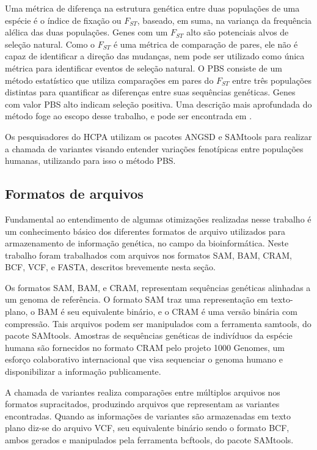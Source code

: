 \documentclass[cic,tc]{iiufrgs}
\begin{document}
Uma métrica de diferença na estrutura genética entre duas populações de uma
espécie é o índice de fixação ou $F_{ST}$, baseado, em suma, na variança da
frequência alélica das duas populações. Genes com um $F_{ST}$ alto são
potenciais alvos de seleção natural.\cite{yi2010sequencing} Como o $F_{ST}$ é
uma métrica de comparação de pares, ele não é capaz de identificar a direção
das mudanças, nem pode ser utilizado como única métrica para identificar
eventos de seleção natural. O PBS consiste de um método estatístico que
utiliza comparações em pares do $F_{ST}$ entre três populações distintas para
quantificar as diferenças entre suas sequências genéticas. Genes com valor
PBS alto indicam seleção positiva.\cite{jiang2019population} Uma descrição
mais aprofundada do método foge ao escopo desse trabalho, e pode ser
encontrada em \cite{yi2010sequencing}.

Os pesquisadores do HCPA utilizam os pacotes ANGSD e SAMtools para realizar
a chamada de variantes visando entender variações fenotípicas entre populações
humanas, utilizando para isso o método PBS.

\subsection{Formatos de arquivos}
\label{sec:formats}

Fundamental ao entendimento de algumas otimizações realizadas nesse trabalho é
um conhecimento básico dos diferentes formatos de arquivo utilizados para
armazenamento de informação genética, no campo da bioinformática. Neste
trabalho foram trabalhados com arquivos nos formatos SAM, BAM, CRAM, BCF, VCF,
e FASTA, descritos brevemente nesta seção.

Os formatos SAM, BAM, e CRAM, representam sequências genéticas alinhadas a um
genoma de referência. O formato SAM traz uma representação em texto-plano, o
BAM é seu equivalente binário, e o CRAM é uma versão binária com compressão.
Tais arquivos podem ser manipulados com a ferramenta samtools, do pacote
SAMtools.\cite{danecek2021twelve} Amostras de sequências genéticas de
indivíduos da espécie humana são fornecidos no formato CRAM pelo projeto 1000
Genomes, um esforço colaborativo internacional que visa sequenciar o genoma
humano e disponibilizar a informação publicamente.\cite{via20101000}

A chamada de variantes realiza comparações entre múltiplos arquivos nos
formatos supracitados, produzindo arquivos que representam as variantes
encontradas. Quando as informações de variantes são armazenadas em texto plano
diz-se do arquivo VCF, seu equivalente binário sendo o formato BCF, ambos
gerados e manipulados pela ferramenta bcftools, do pacote
SAMtools.\cite{danecek2021twelve}
\end{document}
